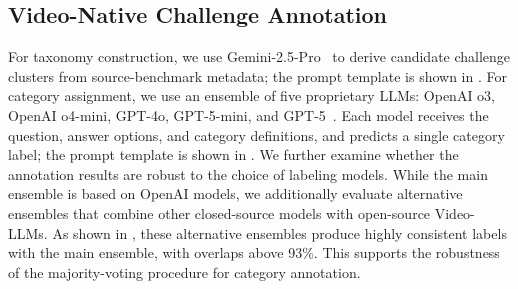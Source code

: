     \subsection{Video-Native Challenge Annotation} \label{sec:d.3}
        For taxonomy construction, we use Gemini-2.5-Pro~\cite{gemini25} to derive candidate challenge clusters from source-benchmark metadata; the prompt template is shown in .
        For category assignment, we use an ensemble of five proprietary LLMs: OpenAI o3, OpenAI o4-mini, GPT-4o, GPT-5-mini, and GPT-5~\cite{o4mini,gpt4o,gpt5}.
        Each model receives the question, answer options, and category definitions, and predicts a single category label; the prompt template is shown in .
        We further examine whether the annotation results are robust to the choice of labeling models.
        While the main ensemble is based on OpenAI models, we additionally evaluate alternative ensembles that combine other closed-source models with open-source Video-LLMs.
        As shown in , these alternative ensembles produce highly consistent labels with the main ensemble, with overlaps above 93\%.
        This supports the robustness of the majority-voting procedure for category annotation.
        
        \begin{table}[h]
            \centering
            \scriptsize
            \caption{Robustness of category labeling under alternative model ensembles.}
            \label{tab:relabel_overlap}
        \end{table}
    
